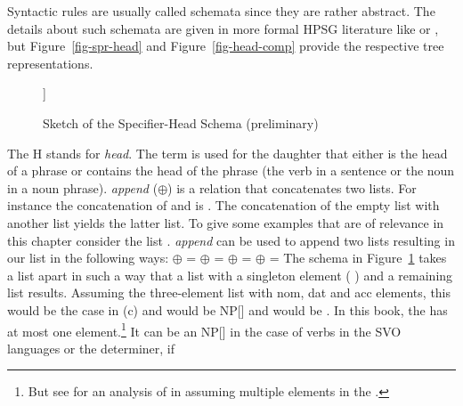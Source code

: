 Syntactic rules are usually called schemata since they are rather abstract. 
The details about such schemata are given in more formal HPSG literature like
 or , 
but Figure~\vref{fig-spr-head} and
Figure~\vref{fig-head-comp} provide the respective tree representations.
\begin{figure}
\begin{forest}
[H\feattab{\spr \ibox{1}}%
  [\ibox{2}]
  [H\feattab{\spr \ibox{1} $\oplus$ \sliste{ \ibox{2} },\\
             \comps \eliste}
  ]]
\end{forest}
\caption{\label{fig-spr-head}Sketch of the Specifier-Head Schema (preliminary)}
\end{figure}
The H stands for \emph{head}. The term  is used for the daughter that either is
the head of a phrase or contains the head of the phrase (\eg the verb in a sentence or the noun in a
noun phrase). \emph{append} ($\oplus$) is a relation that concatenates two 
lists. For instance the concatenation of  and  is
. The concatenation of the empty list \eliste{} with another list yields
the latter list. To give some examples that are of relevance in this chapter consider the list
. \emph{append} can be used to append two
lists resulting in our list in the following ways:
\eal
\ex \eliste{} $\oplus$  = 
\ex {} $\oplus$  = 
\ex {} $\oplus$  = 
\ex {} $\oplus$ \eliste{} = 
\zl
The schema in Figure~\ref{fig-spr-head} takes a list apart in such a way that a list with a
singleton element (  ) and a remaining list  results. Assuming the
three-element list with nom, dat and acc elements, this would be the case in (c) and  would be NP[] and
 would be . In this book, the \sprl has at most one element.\footnote{
  But see  for an analysis of  in  assuming multiple elements in
  the \sprl.
} It can be an NP[] in the case of verbs in the SVO languages or the determiner, if
